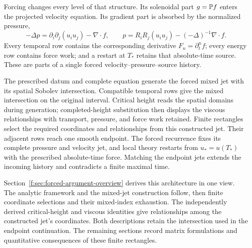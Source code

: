 Forcing changes every level of that structure. Its solenoidal part
\(g=\mathbb P f\) enters the projected velocity equation. Its gradient part is
absorbed by the normalized pressure,
\[
 -\Delta p=\partial_i\partial_j(u_i u_j)-\nabla\cdot f,
 \qquad
 p=R_iR_j(u_i u_j)-(-\Delta)^{-1}\nabla\cdot f.
\]
Every temporal row contains the corresponding derivative
\(F_n=\partial_t^nf\); every energy row contains force work; and a restart at
\(T_*\) retains that absolute-time source. These are parts of a single
forced velocity--pressure--source history.

The prescribed datum and complete equation generate the forced mixed jet
with its spatial Sobolev intersection. Compatible temporal rows give the
mixed intersection on the original interval. Critical height reads the
spatial domains during generation; completed-height substitution then
displays the viscous relationships with transport, pressure, and force work
retained. Finite rectangles select the required coordinates and relationships
from this constructed jet. Their adjacent rows reach one smooth endpoint.
The forced recurrence fixes its complete pressure and velocity jet, and local
theory restarts from \(u_*=u(T_*)\) with the prescribed absolute-time force.
Matching the endpoint jets extends the incoming history and contradicts a
finite maximal time.

Section~\ref{f:sec:forced-argument-overview} derives this architecture in one
view. The analytic framework and the mixed-jet construction follow, then finite
coordinate selections and their mixed-index exhaustion. The independently
derived critical-height and viscous identities give relationships among the
constructed jet's coordinates. Both descriptions retain the intersection used
in the endpoint continuation.
The remaining sections record matrix formulations and quantitative
consequences of these finite rectangles.
